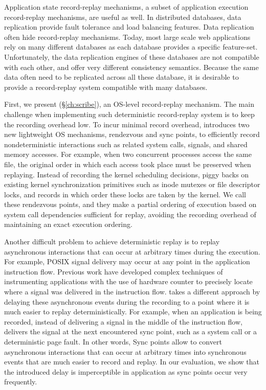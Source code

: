 Application state record-replay mechanisms, a subset of application execution
record-replay mechanisms, are useful as well.  In distributed
databases, data replication provide fault tolerance and load balancing
features. Data replication often hide record-replay mechanisms.
Today, most large scale web applications rely on many different databases as
each database provides a specific feature-set. Unfortunately, the data replication
engines of these databases are not compatible with each other, and offer very
different consistency semantics. Because the same data often need to be
replicated across all these database, it is desirable to provide a
record-replay system compatible with many databases.

First, we present \scribe (\S\ref{ch:scribe}), an OS-level record-replay
mechanism. The main challenge when implementing such deterministic record-replay
system is to keep the recording overhead low. To incur minimal record overhead,
\scribe introduces two new lightweight OS mechanisms, rendezvous and sync
points, to efficiently record nondeterministic interactions such as related
system calls, signals, and shared memory accesses. For example, when
two concurrent processes access the same file, the original order in which
each access took place must be preserved when replaying.
Instead of recording the kernel scheduling decisions, \scribe piggy backs on
existing kernel synchronization primitives such as inode mutexes or file
descriptor locks, and records in which order these locks are taken by the kernel.
We call these rendezvous points, and they make a partial ordering of execution
based on system call dependencies sufficient for replay, avoiding the recording
overhead of maintaining an exact execution ordering.

Another difficult problem to achieve deterministic replay is to replay
asynchronous interactions that can occur at arbitrary times during the
execution. For example, POSIX signal delivery may occur at any point in the
application instruction flow. Previous work have developed complex techniques
of instrumenting applications with the use of hardware counter to precisely
locate where a signal was delivered in the instruction flow.
\scribe takes a different approach by delaying these asynchronous events
during the recording to a point where it is much easier to replay
deterministically. For example, when an application is being recorded,
instead of delivering a signal in the middle of the instruction flow, \scribe
delivers the signal at the next encountered sync point, such as a system call or
a deterministic page fault. In other words,
Sync points allow \scribe to convert asynchronous interactions that can occur at
arbitrary times into synchronous events that are much easier to record and
replay. In our evaluation, we show that the introduced delay is imperceptible
in application as sync points occur very frequently.

